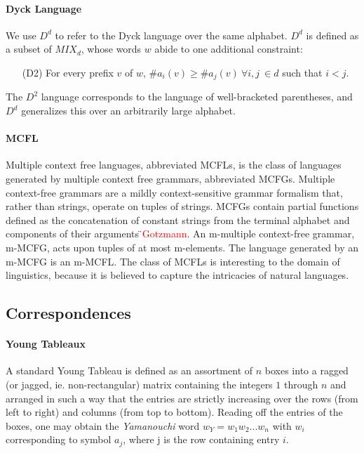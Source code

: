 \documentclass[nonatbib,numbers,10pt]{sigplanconf}
\newcommand\todo[1]{\textcolor{red}{#1}}
\begin{document}
\paragraph{Dyck Language}
We use $D^d$ to refer to the Dyck language over the same alphabet. $D^d$ is defined as a subset of $MIX_d$, whose words $w$ abide to one additional constraint:
\begin{itemize}
\item[(D2)] For every prefix $v$ of $w$, $ \#a_i(v) \geq \#a_j(v) \ \forall i, j \ \in d$ such that $i < j$.
\end{itemize}

The $D^2$ language corresponds to the language of well-bracketed parentheses, and $D^d$ generalizes this over an arbitrarily large alphabet.
\paragraph{MCFL}
Multiple context free languages, abbreviated MCFLs, is the class of languages generated by multiple context free grammars, abbreviated MCFGs. Multiple context-free grammars are a mildly context-sensitive grammar formalism that, rather than strings, operate on tuples of strings. MCFGs contain partial functions defined as the concatenation of constant strings from the terminal alphabet and components of their arguments \todo{̈Gotzmann}. An m-multiple context-free grammar, m-MCFG, acts upon tuples of at most m-elements. The language generated by an m-MCFG is an m-MCFL. The class of MCFLs is interesting to the domain of linguistics, because it is believed to capture the intricacies of natural languages.

\subsection{Correspondences}
%
\paragraph{Young Tableaux}
A standard Young Tableau is defined as an assortment of $n$ boxes into a ragged (or jagged, ie. non-rectangular) matrix containing the integers $1$ through $n$ and arranged in such a way that the entries are strictly increasing over the rows (from left to right) and columns (from top to bottom). Reading off the entries of the boxes, one may obtain the \textit{Yamanouchi} word $w_Y =w_1 w_2 ... w_n$ with $w_i$ corresponding to symbol $a_j$, where j is the row containing entry $i$.
\end{document}
